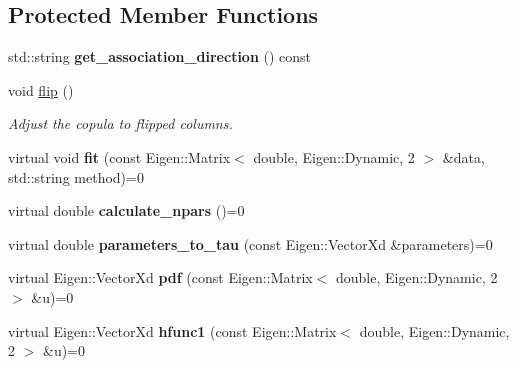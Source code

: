 \subsection*{Protected Member Functions}
\begin{DoxyCompactItemize}
\item 
std\+::string {\bfseries get\+\_\+association\+\_\+direction} () const \hypertarget{classvinecopulib_1_1_abstract_bicop_a5eb314dcf55efcfc022b909f521d520b}{}\label{classvinecopulib_1_1_abstract_bicop_a5eb314dcf55efcfc022b909f521d520b}

\item 
void \hyperlink{classvinecopulib_1_1_abstract_bicop_a4e62970bb8e533f97f66c280c1a908cf}{flip} ()\hypertarget{classvinecopulib_1_1_abstract_bicop_a4e62970bb8e533f97f66c280c1a908cf}{}\label{classvinecopulib_1_1_abstract_bicop_a4e62970bb8e533f97f66c280c1a908cf}

\begin{DoxyCompactList}\small\item\em Adjust the copula to flipped columns. \end{DoxyCompactList}\item 
virtual void {\bfseries fit} (const Eigen\+::\+Matrix$<$ double, Eigen\+::\+Dynamic, 2 $>$ \&data, std\+::string method)=0\hypertarget{classvinecopulib_1_1_abstract_bicop_ad77e75d1b9336e96940b7574f3f184f7}{}\label{classvinecopulib_1_1_abstract_bicop_ad77e75d1b9336e96940b7574f3f184f7}

\item 
virtual double {\bfseries calculate\+\_\+npars} ()=0\hypertarget{classvinecopulib_1_1_abstract_bicop_af460c2a5a6d2743080b3a883182cd78e}{}\label{classvinecopulib_1_1_abstract_bicop_af460c2a5a6d2743080b3a883182cd78e}

\item 
virtual double {\bfseries parameters\+\_\+to\+\_\+tau} (const Eigen\+::\+Vector\+Xd \&parameters)=0\hypertarget{classvinecopulib_1_1_abstract_bicop_a71ba68887d581483bd51697885dc2d8c}{}\label{classvinecopulib_1_1_abstract_bicop_a71ba68887d581483bd51697885dc2d8c}

\item 
virtual Eigen\+::\+Vector\+Xd {\bfseries pdf} (const Eigen\+::\+Matrix$<$ double, Eigen\+::\+Dynamic, 2 $>$ \&u)=0\hypertarget{classvinecopulib_1_1_abstract_bicop_a4594c3b99a7f2d949a52bf177b1651c3}{}\label{classvinecopulib_1_1_abstract_bicop_a4594c3b99a7f2d949a52bf177b1651c3}

\item 
virtual Eigen\+::\+Vector\+Xd {\bfseries hfunc1} (const Eigen\+::\+Matrix$<$ double, Eigen\+::\+Dynamic, 2 $>$ \&u)=0\hypertarget{classvinecopulib_1_1_abstract_bicop_a2dece0c5a4690e18e8407ea9078522fd}{}\label{classvinecopulib_1_1_abstract_bicop_a2dece0c5a4690e18e8407ea9078522fd}


\end{DoxyCompactItemize}
